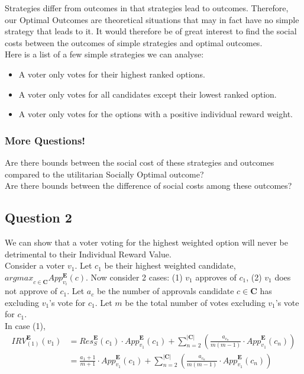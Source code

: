 \documentclass{article}
\begin{document}
Strategies differ from outcomes in that strategies lead to outcomes. Therefore, our Optimal Outcomes are theoretical situations that may in fact have no simple strategy that leads to it. It would therefore be of great interest to find the social costs between the outcomes of simple strategies and optimal outcomes.\\

\noindent Here is a list of a few simple strategies we can analyse:
\begin{itemize}
  \item A voter only votes for their highest ranked options.
  \item A voter only votes for all candidates except their lowest ranked option.
  \item A voter only votes for the options with a positive individual reward weight.
\end{itemize}

\subsubsection{More Questions!}

Are there bounds between the social cost of these strategies and outcomes compared to the utilitarian Socially Optimal outcome?\\
Are there bounds between the difference of social costs among these outcomes?

\subsection{Question 2}
We can show that a voter voting for the highest weighted option will never be detrimental to their Individual Reward Value.\\

Consider a voter $v_{1}$. Let $c_{1}$ be their highest weighted candidate, ${argmax}_{c \in \pmb{C}}App^{\pmb{E}}_{v_{i}}(c)$. Now consider 2 cases: (1) $v_{1}$ approves of $c_{1}$, (2) $v_{1}$ does not approve of $c_{1}$. Let $a_{c}$ be the number of approvals candidate $c \in \pmb{C}$ has excluding $v_{1}$'s vote for $c_{1}$. Let $m$ be the total number of votes excluding $v_{1}$'s vote for $c_{1}$.\\

In case (1), 
\begin{equation}
\begin{aligned}
{IRV}^{\pmb{E}}_{(1)}(v_1) 
&= {Res}^{\pmb{E}}_{S}(c_1)\cdot{App}^{\pmb{E}}_{v_1}(c_1) + \sum^{|\pmb{C}|}_{n = 2}{\left(\frac{a_{c_n}}{m(m-1)}\cdot{App}^{\pmb{E}}_{v_1}(c_{n})\right)}\\
&= \frac{a_1+1}{m+1}\cdot{App}^{\pmb{E}}_{v_1}(c_1) + \sum^{|\pmb{C}|}_{n = 2}{\left(\frac{a_{c_n}}{m(m-1)}\cdot{App}^{\pmb{E}}_{v_1}(c_{n})\right)}
\end{aligned}  
\end{equation}
\end{document}
